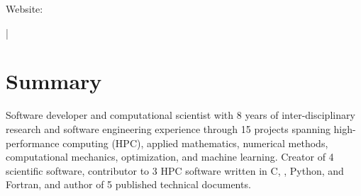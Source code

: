 \documentclass[letterpaper,10pt]{article}
\begin{document}
{\scshape\huge\Author}\vspace{2pt}

\begin{small}
  Website: \href{\AuthorWebsiteLink}{\AuthorWebsiteText}

  \vspace{2pt}\AuthorAddress

  \vspace{1pt}\href{mailto:\AuthorEmail}{\AuthorEmail} |
  \href{\AuthorPhoneLink}{\AuthorPhoneText}
\end{small}

\section{Summary}
Software developer and computational scientist with 8 years of
inter-disciplinary research and software engineering experience through
15\smallplus{} projects spanning high-performance computing (HPC), applied
mathematics, numerical methods, computational mechanics, optimization, and
machine learning. Creator of 4 scientific software, contributor to 3 HPC
software written in C, \CC{}, Python, and Fortran, and author of 5 published
technical documents.


\vspace{-182.8pt}
\end{document}

